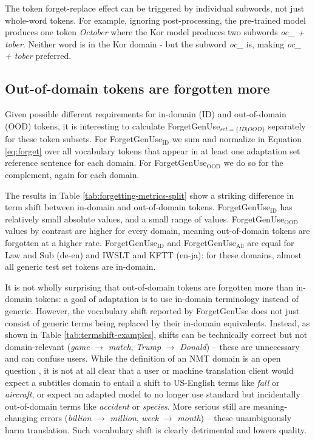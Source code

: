 \documentclass[11pt]{article}
\begin{document}
The token forget-replace effect can be triggered by individual subwords, not just whole-word tokens. For example, ignoring post-processing, the pre-trained model produces one token \emph{October} where the Kor model produces two subwords \emph{oc\_ + tober}. Neither word is in the Kor domain - but the subword \emph{oc\_} is,  making \emph{oc\_ + tober} preferred. 


\subsection{Out-of-domain tokens are forgotten more}
 Given possible different requirements for in-domain (ID) and out-of-domain (OOD) tokens, it is interesting to calculate ForgetGenUse$_{set=\{ID|OOD\}}$ separately for these token subsets. For ForgetGenUse$_{\text{ID}}$ we sum and normalize in Equation \ref{eq:forget} over all vocabulary tokens that appear in at least one adaptation set reference sentence for each domain. For ForgetGenUse$_{\text{OOD}}$ we do so for the complement, again for each domain.

The results in Table \ref{tab:forgetting-metrics-split} show a striking difference in term shift between in-domain and out-of-domain tokens. ForgetGenUse$_{\text{ID}}$ has relatively small absolute values, and a small range of values.  ForgetGenUse$_{\text{OOD}}$ values by contrast are higher for every domain, meaning out-of-domain tokens are forgotten at a higher rate. ForgetGenUse$_{\text{ID}}$ and ForgetGenUse$_{\text{All}}$ are equal for Law and Sub (de-en) and IWSLT and KFTT (en-ja): for these domains,  almost all generic test set  tokens are in-domain.

It is not wholly surprising that out-of-domain tokens are forgotten more than in-domain tokens: a goal of adaptation is to use in-domain terminology instead of  generic. However, the vocabulary shift reported by ForgetGenUse does not just consist of generic terms being replaced by their in-domain equivalents. Instead, as shown in Table \ref{tab:termshift-examples}, shifts can be technically correct but not domain-relevant (\emph{game} $\rightarrow$ \emph{match}, \emph{Trump} $\rightarrow$ \emph{Donald}) -- these are unnecessary and can confuse users. While the definition of an NMT domain is an open question \cite{van-der-wees-etal-2015-whats, saunders-2022-domain-jair}, it is not at all clear that a user or machine translation client would expect a subtitles domain to entail a shift to US-English terms like \emph{fall} or \emph{aircraft}, or expect an adapted model to no longer use standard but incidentally out-of-domain terms like \emph{accident} or \emph{species}. More serious still are meaning-changing errors  (\emph{billion} $\rightarrow$ \emph{million}, \emph{week} $\rightarrow$ \emph{month}) -- these unambiguously harm translation. Such vocabulary shift is clearly detrimental and lowers quality.
 
\end{document}
